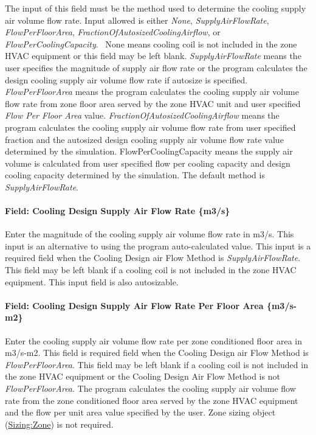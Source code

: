The input of this field must be the method used to determine the cooling supply air volume flow rate. Input allowed is either \emph{None}, \emph{SupplyAirFlowRate}, \emph{FlowPerFloorArea}, \emph{FractionOfAutosizedCoolingAirflow}, or \emph{FlowPerCoolingCapacity}.~ None means cooling coil is not included in the zone HVAC equipment or this field may be left blank. \emph{SupplyAirFlowRate} means the user specifies the magnitude of supply air flow rate or the program calculates the design cooling supply air volume flow rate if autosize is specified. \emph{FlowPerFloorArea} means the program calculates the cooling supply air volume flow rate from zone floor area served by the zone HVAC unit and user specified \emph{Flow Per Floor Area} value. \emph{FractionOfAutosizedCoolingAirflow} means the program calculates the cooling supply air volume flow rate from user specified fraction and the autosized design cooling supply air volume flow rate value determined by the simulation. FlowPerCoolingCapacity means the supply air volume is calculated from user specified flow per cooling capacity and design cooling capacity determined by the simulation. The default method is \emph{SupplyAirFlowRate}.

\paragraph{Field: Cooling Design Supply Air Flow Rate \{m3/s\}}\label{field-cooling-design-supply-air-flow-rate-m3s}

Enter the magnitude of the cooling supply air volume flow rate in m3/s. This input is an alternative to using the program auto-calculated value. This input is a required field when the Cooling Design air Flow Method is \emph{SupplyAirFlowRate}. This field may be left blank if a cooling coil is not included in the zone HVAC equipment. This input field is also autosizable.

\paragraph{Field: Cooling Design Supply Air Flow Rate Per Floor Area \{m3/s-m2\}}\label{field-cooling-design-supply-air-flow-rate-per-floor-area-m3s-m2}

Enter the cooling supply air volume flow rate per zone conditioned floor area in m3/s-m2. This field is required field when the Cooling Design air Flow Method is \emph{FlowPerFloorArea}. This field may be left blank if a cooling coil is not included in the zone HVAC equipment or the Cooling Design Air Flow Method is not \emph{FlowPerFloorArea}. The program calculates the cooling supply air volume flow rate from the zone conditioned floor area served by the zone HVAC equipment and the flow per unit area value specified by the user. Zone sizing object (\hyperref[sizingzone]{Sizing:Zone}) is not required.

